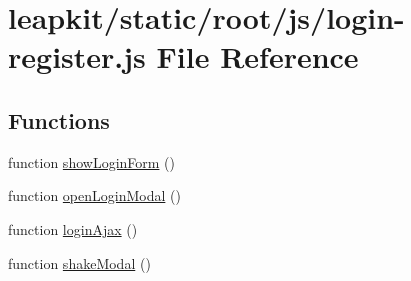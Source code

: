 \hypertarget{static_2root_2js_2login-register_8js}{\section{leapkit/static/root/js/login-\/register.js File Reference}
\label{static_2root_2js_2login-register_8js}
}
\subsection*{Functions}
\begin{DoxyCompactItemize}
\item 
function \hyperlink{static_2root_2js_2login-register_8js_a7a1e1be931867b99f07d70b910a148e1}{show\-Login\-Form} ()
\item 
function \hyperlink{static_2root_2js_2login-register_8js_adffc6a2438c18750d0115917a26c3ffe}{open\-Login\-Modal} ()
\item 
function \hyperlink{static_2root_2js_2login-register_8js_a3b73b2b5f09f8646efc769a3c149b300}{login\-Ajax} ()
\item 
function \hyperlink{static_2root_2js_2login-register_8js_a86ffdc2d61bae56a84dd274ae5fbca07}{shake\-Modal} ()
\end{DoxyCompactItemize}


